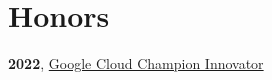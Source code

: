 \section{Honors}
 \resumeSubHeadingListStart
    \item
      {\textbf{2022}, \href{https://cloud.google.com/innovators/innovator?profileId=105659115322336893250}{Google Cloud Champion Innovator}}
 \resumeSubHeadingListEnd
